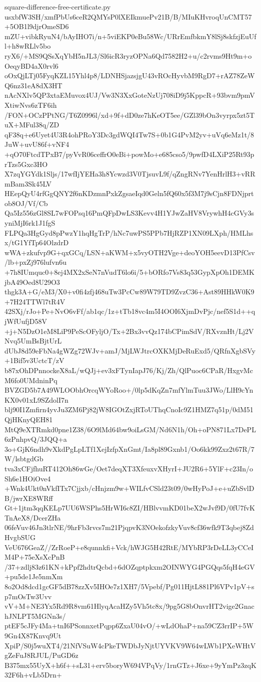 \documentclass[11pt]{article}
\theoremstyle{definition}
\theoremstyle{remark}
\begin{document}
\begin{filecontents*}[overwrite]{square-difference-free-certificate.py}
usxbfW3SH/xmfPbUs6ceR2QMYsP0lXEIkmuePv21B/B/MIuKHvroqUnCMT57+5OB1l9djrOmeSD6
mZU+vibkRyuN4/bAyIHO7i/n+5viEKP0eBu58Wc/URrEmfbkmY8lSj8skfzjEuUfl+h8wRLlv5bo
ryX6/+MS9QSsXqYbH5nJL3/Sl6icR3ryzOPNa6Qd7582H2+u/c2rvms9Ht9m+oOeqyBD4aX0rvl6
oOxQjLTj05FyqKZL15Yhl4p8/LDNHSjazsjgU43vROcHyvbM9RgD7+rAZ78ZeWQ6nz31eA8dX3HT
nAcNXlv5QP3xtaEMuvox4UJ/Vw3N3XxGoteNzUj708iD9j5KppcR+93bvm9pmVXtiwNvs6zTF6ih
/FON+OCzPPtNG/T6Z0996l/xd+9f+dD0ze7hKeOT5ee/GZl39bOn3vyrpx5zt5TuX+MFul38q/ZD
qF38q+e6Uyet4U3R4ohPRoY3Dc3gdWQI4Tw7S+0b1G4PvM2yv+uVq6eMz1t/8JuW+uvU86f+vNF4
+qO70FtcdTPxB7/pyVvR06ceffrO0eBi+powMo+e685cso5/9pwfD4LXiP25Rt93prTzs5Gxc3HO
X7zqYGYdk1Sljs/17wfIjYEHa3h8Ycwzd3V0TjsuvL9f/qZngRNv7YenHrlH3+vRRmBam3Sk45LV
HEepQyU4rfGgQNY2f6nKDzmnPxkZgsaeIqd0Geln5fQ60x5f3M7j9sCjn8FDNjprtob8OJ/Vf/Cb
Qa5Iz556zGl8SL7wFOPsq16PmQFpDwLS3Kevv4H1YJwZaHV8VrywhH4cGVy3syniMjI6rk1J1fgS
FLPQa3HgGyd8pPwzY1hqHgTrP/hNc7uwPS5PPb7HjRZP1XN09LXph/HMLhsx/tG1YfTp64OlzdrD
wWA+zkufvp9G+qxGCq/LSN+aKWM+x5vyOTH2Vge+deoYOH5eevD13PfCsv/lb+pxZj976lufvn6u
+7h8IUmquc0+8ej4MX2xSeN7nVudT6lo6i/5+bORfo7Vs83q53GypXpOh1DEMKjbA49Oed8U29O3
thgk3A+G/eM3/X0+v0fi4zfj468uTw3PcCw89W79TD9ZvzC36+Ast89HHkW0K9+7H24TTWl7tR4V
42SXj/rJo+Pe+NvO6vFf/ab1qc/1z+tTb18vc4m5I4OOI6XjmDvPjc/nef5S1d++qjWfUufjD58V
+j+N5DzO1eM8LiP9PeScOFyljO/Tx+2Bx3vvQz174bCPimSdV/RXvznHt/Lj2VNvq5UmBsBjtUrL
dUbJ8d59eFbNa4gWZg72WJv+amJ/MjLWJtrcOXKMjDeRuExd5/QRfnXgbSVy+1Bif5v3UctcT/zV
b87xOhDPnnockeX8aL/wQJj+ev3xFTynIapJ76/Kj/Zh/QlPuoc6CPaR/HxgvMcM6fo0UMdninPq
BVZGD5b7A49WLOObhOrcqWYoRoo+/0lp5dKqZn7mfYlmTuu3JWo/LlH9cYnKX0v01xL9SZdolI7n
blj90I1Zmfirn4yvJu3ZM6Pj82jW8IGOtZxjRToUThqCnoIc9Z1HMZ7q51p/0dM51QjHKnyQEH81
MtQ9eXTRmkd0pne1Z38/6O9lMd64bw9oiLsGM/Nd6N1h/Oh+oPN871Lx7DePL6zPnhpvQ/3JQQ+a
3o+GjK6ndh9vXkdPgLpLTf1XejIzfpXnGmt/Ia8pl89Gxnb1/Oo6kk99Zxz2t67R/7W/lsbtgdGb
tva3xCFjfhuRT412Oh86wGe/Oet7deqXT3XfeuxvXHyrI+JU2R6+5YlF+c23In/oSh6e1HOiOve4
+Wnk4Ukt0nVkfITx7Cjjxb/cHnjzm9w+WILfvCSld23t09/0wHyPoJ+e+uZbSvlDB/jwrXE8WRff
Gt+1jtm3qqKELp7UU6WSPhs5HrWI6c8ZI/HBlvvmKD01beX2wJvf9D/0fU7fvKTnAeX8/DcerZHa
06feVuv46Jn3tlrNE/9hrFb3rvcs7m21PjqpvK3NOekofzkyVuv8cf36wfk9T3qbej8ZdHvgbSUG
VeU676GeaZ//ZrRoeP+e8qunnkfi+Vck/hWJG5H42RtE/MYbRP3rDeLL3yCCeIM4P+75eXsXcPnB
/37+zdlj83z61KN+kPpf2hdtrQcbd+6dOZqptpkxm2OINWYG4PGQqs5fqH4eGV+pu5de1Je5nmXm
8o2Od8dcd1gcGF5dB78zzXv5IHOe7z1XH7/5Vpebf/Pg011HjtL881Pl6VPv1pV+sp7mOsTw3Uvv
vV+M+NE3Yx5Rd9R8vm61HlyqAcaHZy5Vh5tc8x/9pg5G8bOnvrHT2vige2GnachJNLPT5MGNn3s/
ptEF5cJFy4Ma+tnI6PSonnxetPqpp6ZxaU04vO/+wLdOhaP+na59CZ3rrIP+5W9Gn4X87Knvq9Ut
XpiP/S0j5wuXT4/21NfVSuW4cPkeTWDbJyNjtUYVKV9W64wLWb1PXeWHtVgZeFuJ8RJUL/PuGD6z
B375mx55UyX+h6f++sL31+erv5boryW694VPqVy/1rnGTz+J6xe+9yYmPz3zqK32F6h+vLb5Drn+

\end{filecontents*}
\end{document}
